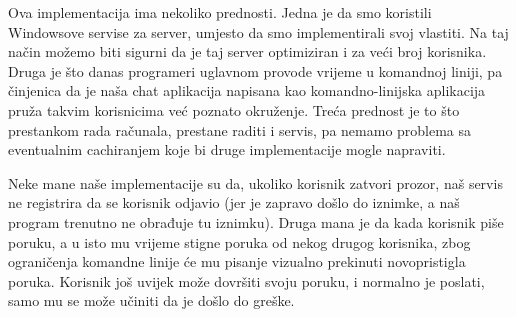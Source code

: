 \documentclass[10pt,a4paper,onecolumn,titlepage]{article}
\begin{document}
Ova implementacija ima nekoliko prednosti. Jedna je da smo koristili Windowsove
servise za server, umjesto da smo implementirali svoj vlastiti. Na taj način
možemo biti sigurni da je taj server optimiziran i za veći broj korisnika.
Druga je što danas programeri uglavnom provode vrijeme u komandnoj liniji,
pa činjenica da je naša chat aplikacija napisana kao komandno-linijska aplikacija
pruža takvim korisnicima već poznato okruženje. Treća prednost je to što prestankom rada računala, prestane raditi i servis, pa nemamo problema sa eventualnim
cachiranjem koje bi druge implementacije mogle napraviti.

Neke mane naše implementacije su da, ukoliko korisnik zatvori prozor, naš servis
ne registrira da se korisnik odjavio (jer je zapravo došlo do iznimke, a naš
program trenutno ne obrađuje tu iznimku). Druga mana je da kada korisnik
piše poruku, a u isto mu vrijeme stigne poruka od nekog drugog korisnika,
zbog ograničenja komandne linije će mu pisanje vizualno prekinuti novopristigla
poruka. Korisnik još uvijek može dovršiti svoju poruku, i normalno je poslati,
samo mu se može učiniti da je došlo do greške.
\end{document}
